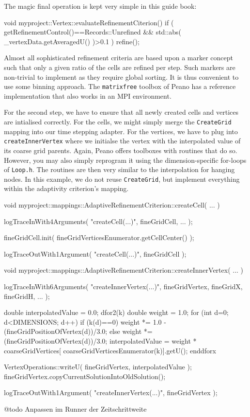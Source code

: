 \noindent
The magic final operation is kept very simple in this guide book:

\begin{code}
void myproject::Vertex::evaluateRefinementCiterion() {
 if (
  getRefinementControl()==Records::Unrefined
  &&
  std::abs( _vertexData.getAveragedU() )>0.1
 ) {
   refine();
 }
}
\end{code}

\begin{remark}
Almost all sophisticated refinement criteria are based upon a marker concept
such that only a given ratio of the cells are refined per step. 
Such markers are non-trivial to implement as they require global sorting.
It is thus convenient to use some binning approach.
The \texttt{matrixfree} toolbox of Peano has a reference implementation that
also works in an MPI environment.
\end{remark}

For the second step, we have to ensure that all newly created cells and vertices
are intialised correctly.
For the cells, we might simply merge the \texttt{CreateGrid} mapping into our
time stepping adapter.
For the vertices, we have to plug into \texttt{createInnerVertex} where we
initialse the vertex with the interpolated value of its coarse grid parents.
Again, Peano offers toolboxes with routines that do so. 
However, you may also simply reprogram it using the dimension-specific for-loops
of \texttt{Loop.h}.
The routines are then very similar to the interpolation for hanging nodes.
In this example, we do not reuse \texttt{CreateGrid}, but implement everything
within the adaptivity criterion's mapping.

\begin{code}
void myproject::mappings::AdaptiveRefinementCriterion::createCell( ... ) {
  logTraceInWith4Arguments( "createCell(...)", fineGridCell, ... );

  fineGridCell.init( fineGridVerticesEnumerator.getCellCenter() );

  logTraceOutWith1Argument( "createCell(...)", fineGridCell );
}


void myproject::mappings::AdaptiveRefinementCriterion::createInnerVertex( ... ) {
  logTraceInWith6Arguments( "createInnerVertex(...)", fineGridVertex, fineGridX, fineGridH, ... );

  double interpolatedValue = 0.0;
  dfor2(k)
    double weight = 1.0;
    for (int d=0; d<DIMENSIONS; d++) {
      if (k(d)==0) {
        weight *= 1.0 - (fineGridPositionOfVertex(d))/3.0;
      }
      else {
        weight *= (fineGridPositionOfVertex(d))/3.0;
      }
    }
    interpolatedValue = weight * coarseGridVertices[ coarseGridVerticesEnumerator(k)].getU();
  enddforx

  VertexOperations::writeU( fineGridVertex, interpolatedValue );
  fineGridVertex.copyCurrentSolutionIntoOldSolution();

  logTraceOutWith1Argument( "createInnerVertex(...)", fineGridVertex );
}
\end{code}


@todo Anpassen im Runner der Zeitschrittweite

